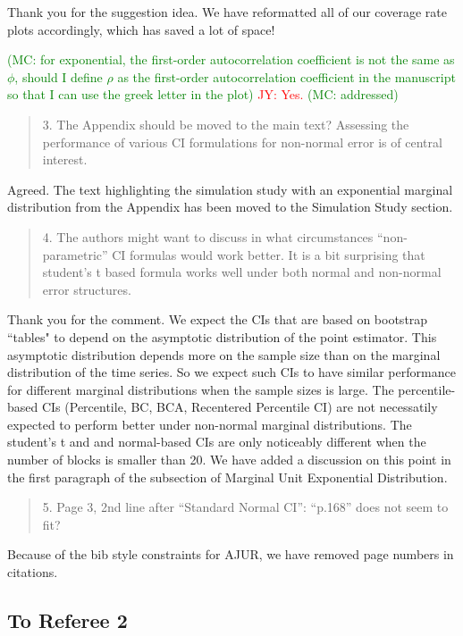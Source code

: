 \documentclass[12pt]{article}
\newcommand{\jy}[1]{\textcolor{red}{JY: #1}}
\newcommand{\mc}[1]{\textcolor{green}{(MC: #1)}}
\newenvironment{comment}%
{\begin{quotation}\noindent\small\it\color{darkblue}\ignorespaces%
}{\end{quotation}}
\begin{document}
Thank you for the suggestion idea. We have reformatted all of our coverage rate plots 
accordingly, which has saved a lot of space!

\mc{for exponential, the first-order autocorrelation coefficient
is not the same as $\phi$, should I define $\rho$ as the first-order 
autocorrelation coefficient in the manuscript so that I can use the greek letter
in the plot}
\jy{Yes.}
\mc{addressed}

\begin{comment}
3. The Appendix should be moved to the main text? Assessing the performance of 
various CI formulations for non-normal error is of central interest.
\end{comment} 

Agreed. The text highlighting the simulation study with an exponential marginal
distribution from the Appendix has been moved to the Simulation Study 
section. 


\begin{comment}
4. The authors might want to discuss in what circumstances “non-parametric” CI 
formulas would work better. It is a bit surprising that student’s t based 
formula works well under both normal and non-normal error structures.
\end{comment}

Thank you for the comment. We expect the CIs that 
are based on bootstrap ``tables" to depend on the 
asymptotic distribution of the point estimator. This asymptotic
distribution depends more on the sample size than on the marginal
distribution of the time series. So we expect such CIs to 
have similar performance for different marginal distributions when the
sample sizes is large.  The percentile-based CIs (Percentile, BC, BCA,
Recentered Percentile CI) are not necessatily expected to perform
better under non-normal marginal distributions. The student's t and
and normal-based CIs are only noticeably different when the number of
blocks is smaller than 20. We have added a discussion on this point in
the first paragraph of the subsection of Marginal Unit Exponential
Distribution.


\begin{comment}
5. Page 3, 2nd line after “Standard Normal CI”: “p.168” does not seem to fit?
\end{comment}

Because of the bib style constraints for AJUR, we have removed page numbers in 
citations.

\subsection*{To Referee 2}
\end{document}
